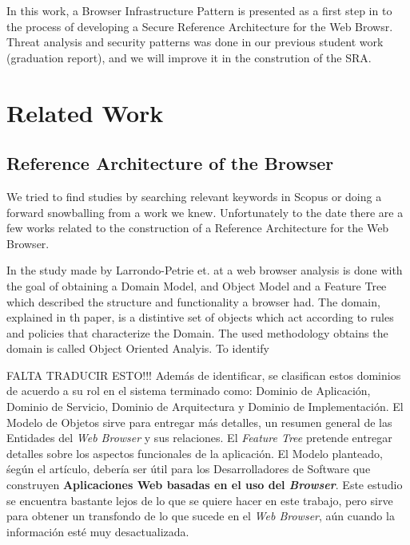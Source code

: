 \documentclass{sig-alternate-05-2015}
\begin{document}
In this work, a Browser Infrastructure Pattern is presented as a first step in to the process of developing a Secure Reference Architecture for the Web Browsr. Threat analysis and security patterns was done in our previous student work (graduation report), and we will improve it in the constrution of the SRA.

\section*{Related Work}
  \subsection*{Reference Architecture of the Browser}
  We tried to find studies by searching relevant keywords in Scopus or doing a forward snowballing from a work \cite{2005-grosskurth-browser-refarch} we knew. Unfortunately to the date there are a few works related to the construction of a Reference Architecture for the Web Browser.

  In the study made by Larrondo-Petrie et. at \cite{535061} a web browser analysis is done with the goal of obtaining a Domain Model, and Object Model and a Feature Tree which described the structure and functionality a browser had. The domain, explained in th paper, is a distintive set of objects which act according to rules and policies that characterize the Domain. The used methodology obtains the domain is called Object Oriented Analyis. To identify

  FALTA TRADUCIR ESTO!!!
   Además de identificar, se clasifican estos dominios de acuerdo a su rol en el sistema terminado como: Dominio de Aplicación, Dominio de Servicio, Dominio de Arquitectura y Dominio de Implementación. El Modelo de Objetos sirve para entregar más detalles, un resumen general de las Entidades del \textit{Web Browser} y sus relaciones. El \textit{Feature Tree} pretende entregar detalles sobre los aspectos funcionales de la aplicación. El Modelo planteado, śegún el artículo, debería ser útil para los Desarrolladores de Software que construyen \textbf{Aplicaciones Web basadas en el uso del \textit{Browser}}.  Este estudio se encuentra bastante lejos de lo que se quiere hacer en este trabajo, pero sirve para obtener un transfondo de lo que sucede en el \textit{\textit{Web Browser}}, aún cuando la información esté muy desactualizada.
\end{document}
